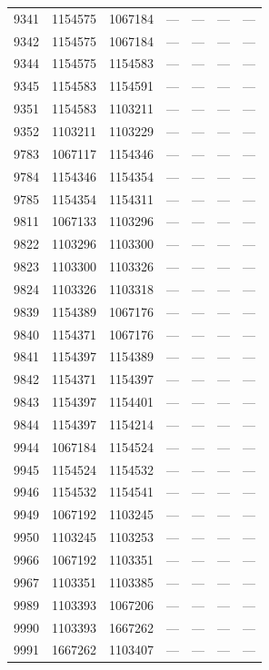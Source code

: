 \begin{longtable}{lcccccc}
9341 & 1154575 & 1067184 & --- & --- & --- & --- \\
9342 & 1154575 & 1067184 & --- & --- & --- & --- \\
9344 & 1154575 & 1154583 & --- & --- & --- & --- \\
9345 & 1154583 & 1154591 & --- & --- & --- & --- \\
9351 & 1154583 & 1103211 & --- & --- & --- & --- \\
9352 & 1103211 & 1103229 & --- & --- & --- & --- \\
9783 & 1067117 & 1154346 & --- & --- & --- & --- \\
9784 & 1154346 & 1154354 & --- & --- & --- & --- \\
9785 & 1154354 & 1154311 & --- & --- & --- & --- \\
9811 & 1067133 & 1103296 & --- & --- & --- & --- \\
9822 & 1103296 & 1103300 & --- & --- & --- & --- \\
9823 & 1103300 & 1103326 & --- & --- & --- & --- \\
9824 & 1103326 & 1103318 & --- & --- & --- & --- \\
9839 & 1154389 & 1067176 & --- & --- & --- & --- \\
9840 & 1154371 & 1067176 & --- & --- & --- & --- \\
9841 & 1154397 & 1154389 & --- & --- & --- & --- \\
9842 & 1154371 & 1154397 & --- & --- & --- & --- \\
9843 & 1154397 & 1154401 & --- & --- & --- & --- \\
9844 & 1154397 & 1154214 & --- & --- & --- & --- \\
9944 & 1067184 & 1154524 & --- & --- & --- & --- \\
9945 & 1154524 & 1154532 & --- & --- & --- & --- \\
9946 & 1154532 & 1154541 & --- & --- & --- & --- \\
9949 & 1067192 & 1103245 & --- & --- & --- & --- \\
9950 & 1103245 & 1103253 & --- & --- & --- & --- \\
9966 & 1067192 & 1103351 & --- & --- & --- & --- \\
9967 & 1103351 & 1103385 & --- & --- & --- & --- \\
9989 & 1103393 & 1067206 & --- & --- & --- & --- \\
9990 & 1103393 & 1667262 & --- & --- & --- & --- \\
9991 & 1667262 & 1103407 & --- & --- & --- & --- \\

\end{longtable}
